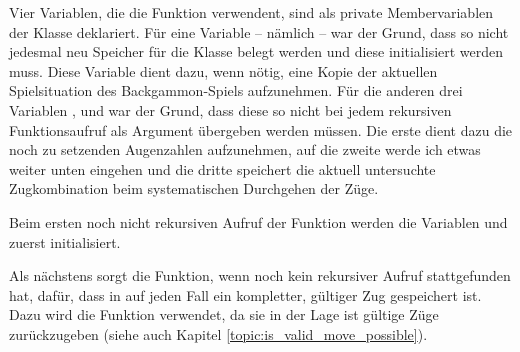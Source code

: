 Vier Variablen, die die Funktion  verwendent, sind als private Membervariablen der Klasse  deklariert. Für eine Variable -- nämlich  -- war der Grund, dass so nicht jedesmal neu Speicher für die Klasse belegt werden und diese initialisiert werden muss. Diese Variable dient dazu, wenn nötig, eine Kopie der aktuellen Spielsituation des Backgammon-Spiels aufzunehmen. Für die anderen drei Variablen ,  und  war der Grund, dass diese so nicht bei jedem rekursiven Funktionsaufruf als Argument übergeben werden müssen. Die erste dient dazu die noch zu setzenden Augenzahlen aufzunehmen, auf die zweite werde ich etwas weiter unten eingehen und die dritte speichert die aktuell untersuchte Zugkombination beim systematischen Durchgehen der Züge.

Beim ersten noch nicht rekursiven Aufruf der Funktion werden die Variablen  und  zuerst initialisiert.

Als nächstens sorgt die Funktion, wenn noch kein rekursiver Aufruf stattgefunden hat, dafür, dass in  auf jeden Fall ein kompletter, gültiger Zug gespeichert ist. Dazu wird die Funktion  verwendet, da sie in der Lage ist gültige Züge zurückzugeben (siehe auch Kapitel \ref{topic:is_valid_move_possible}).

